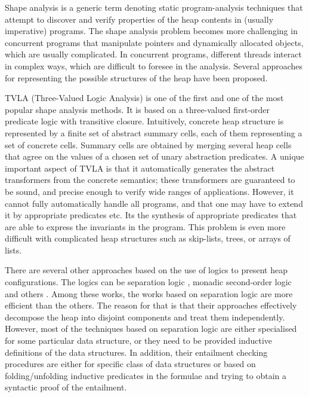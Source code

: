 Shape analysis is a generic term denoting static
program-analysis techniques that attempt to discover and verify properties of the heap contents in (usually imperative) programs. The shape analysis problem becomes more challenging in concurrent programs that manipulate pointers and dynamically allocated objects, which are usually complicated. 
In concurrent programs, different threads interact in complex ways, which are difficult to foresee in the analysis. Several approaches for representing the possible structures of the heap have been proposed.

TVLA (Three-Valued Logic Analysis) \cite{SagivRW02} is one of the first and one of the most popular shape analysis
methods. It is based on a three-valued first-order predicate logic with transitive closure. Intuitively, concrete heap structure is represented by a finite set of abstract summary cells, each of them representing a set of concrete cells. Summary cells are obtained by merging several heap cells that agree on the values of a chosen set of unary abstraction predicates.  %
A unique important aspect of TVLA is that it automatically generates the abstract transformers from the concrete semantics; these transformers are guaranteed to be sound, and precise enough to verify wide ranges of applications. However, it cannot fully automatically handle all programs, and that one may have to extend it by appropriate predicates etc. Its the synthesis of appropriate predicates that are able to express the invariants in the program. This problem is even more difficult with complicated heap structures such as skip-lists, trees, or arrays of lists.  

There are several other approaches
 based on the use of logics to present heap configurations. The logics can be separation logic \cite{John:SL, Stephen:SL,JoshCris:SL,Hongseok:SL,Kamil:SL,Chin:SL,Quang:SL, Ruzica:SL, Constrantin:SL}, monadic second-order
 logic \cite{Ander:ML, Jakob:ML,Madhusudan:ML} and others \cite{Shmuel:Shape, Karen:Shape}. Among these works, the works based on separation logic are
  more efficient than the others. 
  The reason for that is that their approaches effectively decompose the heap into disjoint components and treat them independently. However, most of the techniques based on separation logic are either specialised for some particular data structure, or they need to be provided inductive definitions of the data structures. In addition, their entailment checking procedures are either for specific class of data structures or based on folding/unfolding inductive predicates in the formulae and trying to obtain a syntactic proof of the entailment. 

